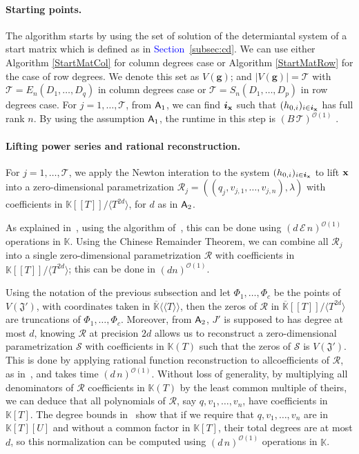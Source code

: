 \documentclass[11pt]{article}
\numberwithin{Property}{section}
\numberwithin{Theorem}{section}
\numberwithin{Proposition}{section}
\numberwithin{Lemma}{section}
\numberwithin{Corollary}{section}
\numberwithin{Definition}{section}
\numberwithin{Remark}{section}
\numberwithin{Conjecture}{section}
\numberwithin{Problem}{section}
\numberwithin{Claim}{section}
\theoremstyle{definition}
\numberwithin{Example}{section}
\def\g {\ensuremath{\mathbf{g}}}
\def\bar{\overline}
\newcommand{\bigO}[1]{\mathcal{O}(#1)} %
\newcommand{\field}{\mathbb{K}} %
\newcommand{\todo}[1]{\textcolor{red}{#1}} %
\newcommand{\improve}[1]{\textcolor{blue}{#1}} %
\begin{document}
\paragraph{Starting points.} The algorithm starts by using the set of solution of the determiantal system of a start matrix which is defined as in \improve{Section~\ref{subsec:cd}}. We can use either Algorithm \ref{StartMatCol} for column degrees case or Algorithm \ref{StartMatRow} for the case of row degrees. We denote this set as $V(\g)$; and $|V(\g)| = \mathcal{T}$ with $\mathcal{T} = E_{n}(D_1, \ldots, D_q)$ in column degrees case  or $\mathcal{T} = S_{n}(D_1, \ldots, D_p)$ in row degrees case. For $j  =1, \ldots, \mathcal{T}$, from ${\sf A}_1 $, we can find ${\bm i}_{\bf x}$ such that $(h_{0,i})_{i \in {\bm i}_{\bf x}}$ has full rank $n$. By using the assumption ${\sf A}_1$, the runtime in this step is $(B \,\mathcal{T})^{\bigO{1}}$ . 

\paragraph{Lifting power series and rational reconstruction.} For $j  =1, \ldots, \mathcal{T}$, we apply the Newton interation to the system $(h_{0,i})_{i \in {\bm i}_{\bf x}}$ to lift ${\bf x}$ into a zero-dimensional parametrization $\mathscr{R}_j = ((q_j,v_{j,1}, \ldots, v_{j,n}), \lambda)$ with coefficients in $\field[[T]]/\langle T^{2d}\rangle$, for $d$ as in ${\sf A}_2$. 

As explained in~\cite[Section~2.2]{SaSc16}, using the algorithm of~\cite{GiLeSa01}, this can be done using $(d\,\mathcal{E}\,n)^{\bigO{1}}$ operations in $\field$. Using the Chinese Remainder Theorem, we can combine all $\mathscr{R}_j$ into a single zero-dimensional parametrization $\mathscr{R}$ with coefficients in $\field[[T]]/\langle T^{2d}\rangle$; this can be done in $(dn)^{\bigO{1}}$. 

Using the notation of the previous subsection and let $\Phi_1,\dots,\Phi_{c}$ be the points of $V(\mathfrak{J}')$, with coordinates taken in $\bar{\field}\langle\langle T \rangle\rangle$, then the zeros of $\mathscr{R}$ in $\bar{\field}[[T]]/\langle T^{2d} \rangle$ are truncations of $\Phi_1,\dots,\Phi_{c}$. Moreover, from ${\sf A}_2$, $J'$ is supposed to has degree at most $d$, knowing $\mathscr{R}$  at precision $2d$ allows us to reconstruct a zero-dimensional parametrization $\mathscr{S}$ with coefficients in $\field(T)$ such that the zeros of $\mathscr{S}$ is $V(\mathfrak{J}')$. This is done by applying rational function reconstruction to allcoefficients of $\mathscr{R}$, as in~\cite{Schost03}, and takes time $(d\,n)^{\bigO{1}}$. Without loss of generality, by multiplying all denominators of $\mathscr{R}$ coefficients in $\field(T)$ by the least common multiple of theirs, we can deduce that all polynomials of $\mathscr{R}$, say $q, v_1, \ldots, v_n$, have coefficients in $\field[T]$. The degree bounds in~\cite{Schost03} show that
if we require that $q, v_1, \ldots, v_n$ are in $\field[T][U]$ and without a common factor in $\field[T]$,
their total degrees are at most $d$, so this normalization can be
computed using $(d\,n)^{\bigO{1}}$ operations in $\field$. 
\end{document}

